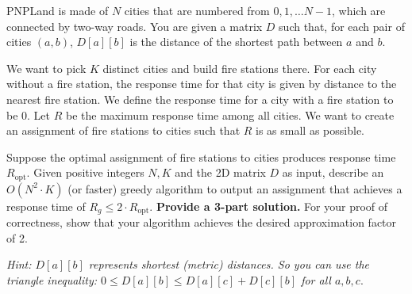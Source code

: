 \documentclass[11pt]{article}
\begin{document}
\pagebreak
{}

PNPLand is made of $N$ cities that are numbered from $0, 1, \dots N-1$, which are connected by two-way roads. You are given a matrix $D$ such that, for each pair of cities $(a,b)$, $D[a][b]$ is the distance of the shortest path between $a$ and $b$.

We want to pick $K$ distinct cities and build fire stations there. For each city without a fire station, the response time for that city is given by distance to the nearest fire station. We define the response time for a city with a fire station to be 0. Let $R$ be the maximum response time among all cities. We want to create an assignment of fire stations to cities such that $R$ is as small as possible. 

Suppose the optimal assignment of fire stations to cities produces response time $R_{\text{opt}}$. Given positive integers $N,K$ and the 2D matrix $D$ as input, describe an $O(N^2 \cdot K)$ (or faster) greedy algorithm to output an assignment that achieves a response time of $R_g \leq 2 \cdot R_{\text{opt}}$. \textbf{Provide a 3-part solution.} For your proof of correctness, show that your algorithm achieves the desired approximation factor of 2. 

\textit{Hint: $D[a][b]$ represents shortest (metric) distances. So you can use the triangle inequality: $0 \leq D[a][b] \leq D[a][c] + D[c][b]$ for all $a, b, c$}.
\end{document}
